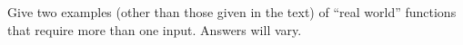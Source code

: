 {Give two examples (other than those given in the text) of ``real world'' functions that require more than one input.}
{Answers will vary.}
